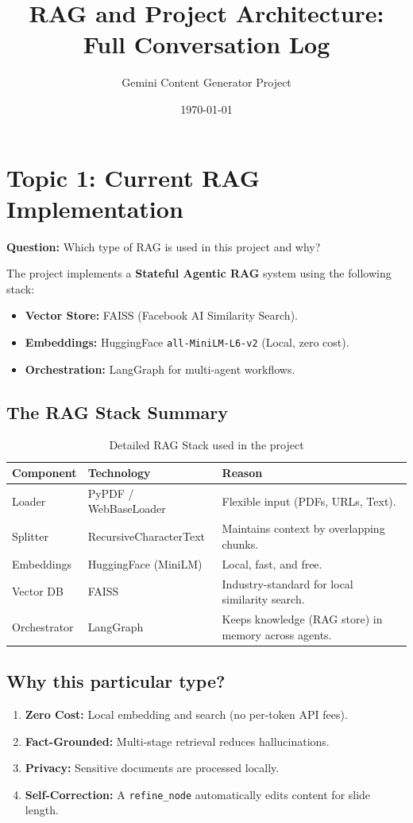 \documentclass[12pt]{article}
\title{RAG and Project Architecture: Full Conversation Log}
\author{Gemini Content Generator Project}
\date{\today}
\begin{document}
\maketitle

\section{Topic 1: Current RAG Implementation}
\textbf{Question:} Which type of RAG is used in this project and why?

\begin{tcolorbox}[colback=blue!5!white,colframe=blue!75!black,title=Agentic Local RAG]
The project implements a \textbf{Stateful Agentic RAG} system using the following stack:
\begin{itemize}
    \item \textbf{Vector Store:} FAISS (Facebook AI Similarity Search).
    \item \textbf{Embeddings:} HuggingFace \texttt{all-MiniLM-L6-v2} (Local, zero cost).
    \item \textbf{Orchestration:} LangGraph for multi-agent workflows.
\end{itemize}
\end{tcolorbox}

\subsection*{The RAG Stack Summary}
\begin{table}[h]
\centering
\begin{tabularx}{\textwidth}{@{}l l X@{}}
\toprule
\textbf{Component} & \textbf{Technology} & \textbf{Reason} \\ \midrule
Loader & PyPDF / WebBaseLoader & Flexible input (PDFs, URLs, Text). \\
Splitter & RecursiveCharacterText & Maintains context by overlapping chunks. \\
Embeddings & HuggingFace (MiniLM) & Local, fast, and free. \\
Vector DB & FAISS & Industry-standard for local similarity search. \\
Orchestrator & LangGraph & Keeps knowledge (RAG store) in memory across agents. \\ \bottomrule
\end{tabularx}
\caption{Detailed RAG Stack used in the project}
\end{table}

\subsection*{Why this particular type?}
\begin{enumerate}
    \item \textbf{Zero Cost:} Local embedding and search (no per-token API fees).
    \item \textbf{Fact-Grounded:} Multi-stage retrieval reduces hallucinations.
    \item \textbf{Privacy:} Sensitive documents are processed locally.
    \item \textbf{Self-Correction:} A \texttt{refine\_node} automatically edits content for slide length.
\end{enumerate}
\end{document}
